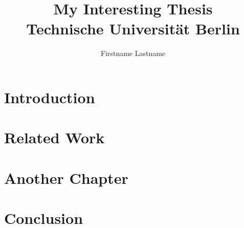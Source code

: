 \documentclass[12pt,twoside]{report}
\title{
{My Interesting Thesis}\\
{\large Technische Universität Berlin}
}
\author{Firstname Lastname}
\begin{document}
\maketitle






\tableofcontents

\chapter{Introduction}
\label{introduction}


\chapter{Related Work}
\label{related-work}


\chapter{Another Chapter}
\label{another_chapter}


\chapter{Conclusion}
\label{conclusion}



\end{document}
